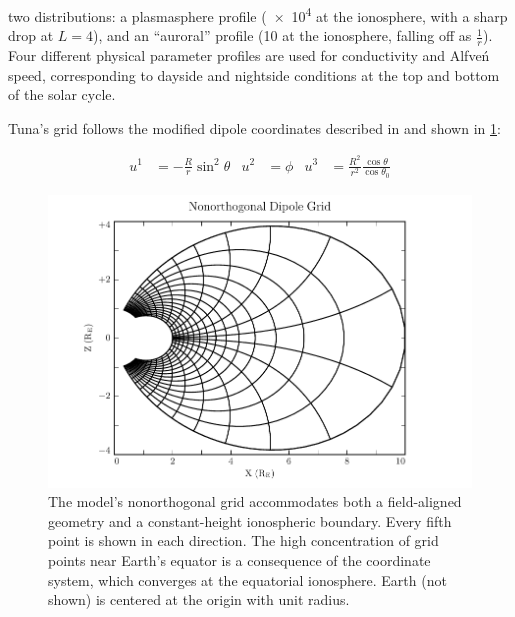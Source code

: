 \documentclass[draft,linenumbers]{agujournal}
\begin{document}
two distributions: a plasmasphere profile (\SI{e4}{\percc} at the ionosphere, with a sharp drop at $L = 4$), and an ``auroral'' profile (\SI{10}{\percc} at the ionosphere, falling off as $\frac{1}{r}$). Four different physical parameter profiles are used for conductivity and Alfve\'n speed, corresponding to dayside and nightside conditions at the top and bottom of the solar cycle.


Tuna's grid follows the modified dipole coordinates described in \citet{lysak_2004} and shown in \cref{fig_grid}:
\begin{linenomath*}
\begin{align}
  \label{def_coords}
  u^1 & = - \frac{R}{r} \sin^2 \theta &
  u^2 & = \phi &
  u^3 & = \frac{R^2}{r^2} \frac{\cos \theta}{\cos \theta_0}
\end{align}
\end{linenomath*}

\begin{figure}
    \begin{center}
    \includegraphics[width=\textwidth]{figures/fig_grid.pdf}
    \caption{
        The model's nonorthogonal grid accommodates both a field-aligned geometry and a constant-height ionospheric boundary. Every fifth point is shown in each direction. The high concentration of grid points near Earth's equator is a consequence of the coordinate system, which converges at the equatorial ionosphere. Earth (not shown) is centered at the origin with unit radius.
    }
    \label{fig_grid}
    \end{center}
\end{figure}
\end{document}
